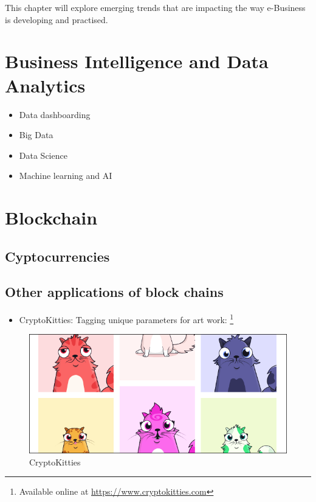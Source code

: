 \documentclass[]{book}
\providecommand{\tightlist}{%
  \setlength{\itemsep}{0pt}\setlength{\parskip}{0pt}}
\let\rmarkdownfootnote\footnote%
\def\footnote{\protect\rmarkdownfootnote}
\begin{document}
This chapter will explore emerging trends that are impacting the way e-Business is developing and practised.

\newpage

\hypertarget{business-intelligence-and-data-analytics}{%
\section{Business Intelligence and Data Analytics}\label{business-intelligence-and-data-analytics}}

\begin{itemize}
\tightlist
\item
  Data dashboarding
\item
  Big Data
\item
  Data Science
\item
  Machine learning and AI
\end{itemize}

\hypertarget{blockchain}{%
\section{Blockchain}\label{blockchain}}

\hypertarget{cyptocurrencies}{%
\subsection{Cyptocurrencies}\label{cyptocurrencies}}

\hypertarget{other-applications-of-block-chains}{%
\subsection{Other applications of block chains}\label{other-applications-of-block-chains}}

\begin{itemize}
\tightlist
\item
  CryptoKitties: Tagging unique parameters for art work: \footnote{Available online at \url{https://www.cryptokitties.com}}
\end{itemize}

\begin{figure}
\centering
\includegraphics{images/cryptokitties.png}
\caption{CryptoKitties}
\end{figure}
\end{document}
